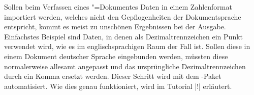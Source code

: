 Sollen beim Verfassen eines "=Dokumentes Daten in einem 
Zahlenformat importiert werden, welches nicht den Gepflogenheiten der 
Dokumentsprache entspricht, kommt es meist zu unschönen Ergebnissen bei der 
Ausgabe. Einfachstes Beispiel sind Daten, in denen als Dezimaltrennzeichen ein 
Punkt verwendet wird, wie es im englischsprachigen Raum der Fall ist. Sollen 
diese in einem Dokument deutscher Sprache eingebunden werden, müssten diese 
normalerweise allesamt angepasst und das ursprüngliche Dezimaltrennzeichen 
durch ein Komma ersetzt werden. Dieser Schritt wird mit dem \TUDScript-Paket 
 automatisiert. Wie dies genau funktioniert, wird im Tutorial 
|!| erläutert.%
%

